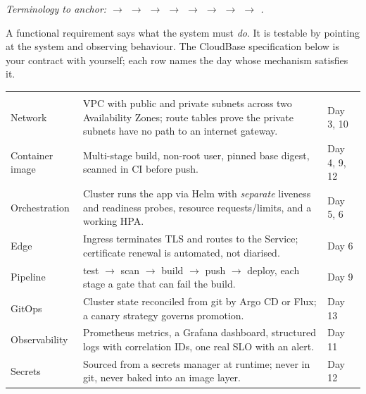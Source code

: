 \begin{center}\small\itshape\color{cInk!70}
Terminology to anchor:  $\rightarrow$  $\rightarrow$  $\rightarrow$  $\rightarrow$  $\rightarrow$  $\rightarrow$  $\rightarrow$  $\rightarrow$ .
\end{center}



 A functional requirement says what the system must \emph{do}. It is testable by pointing at the system and observing behaviour. The CloudBase specification below is your contract with yourself; each row names the day whose mechanism satisfies it.

\begin{center}\small
\wbrowcolors
\begin{tabularx}{\linewidth}{@{}L{34mm} X L{15mm}@{}}
 &  & \\
Network & VPC with public and private subnets across two Availability Zones; route tables prove the private subnets have no path to an internet gateway. & Day 3, 10\\
Container image & Multi-stage build, non-root user, pinned base digest, scanned in CI before push. & Day 4, 9, 12\\
Orchestration & Cluster runs the app via Helm with \emph{separate} liveness and readiness probes, resource requests/limits, and a working HPA. & Day 5, 6\\
Edge & Ingress terminates TLS and routes to the Service; certificate renewal is automated, not diarised. & Day 6\\
Pipeline & test $\rightarrow$ scan $\rightarrow$ build $\rightarrow$ push $\rightarrow$ deploy, each stage a gate that can fail the build. & Day 9\\
GitOps & Cluster state reconciled from git by Argo CD or Flux; a canary strategy governs promotion. & Day 13\\
Observability & Prometheus metrics, a Grafana dashboard, structured logs with correlation IDs, one real SLO with an alert. & Day 11\\
Secrets & Sourced from a secrets manager at runtime; never in git, never baked into an image layer. & Day 12\\
\end{tabularx}
\end{center}

